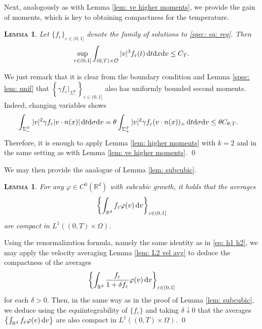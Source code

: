 \documentclass[10pt, reqno]{amsart}
\theoremstyle{plain}
\newtheorem{lemma}[theorem]{\normalfont \scshape Lemma}
\theoremstyle{definition}
\theoremstyle{remark}
\renewenvironment{proof}[1][\proofname]{\noindent{\scshape #1.\quad}}{\qed}
\numberwithin{equation}{section}
\newcommand{\calO}{\mathcal O}
\newcommand{\R}{\mathbb{R}}
\newcommand{\ve}{\varepsilon}
\newcommand{\dx}{\textnormal{d}x}
\newcommand{\dv}{\textnormal{d}v}
\newcommand{\dt}{\textnormal{d}t}
\newcommand{\tnd}{\textnormal{d}}
\newcommand{\lt}{\left}
\newcommand{\rt}{\right}
\newcommand{\intr}{\int_{\R^d}}
\begin{document}
Next, analogously as with Lemma \ref{lem: ve higher moments}, we provide the gain of moments, which is key to obtaining compactness for the temperature.

\begin{lemma}
    Let $\{f_\ve\}_{\ve\in (0,1]}$ denote the family of solutions to \eqref{spec: eq: reg}. Then
\[
        \sup_{\ve\in (0,1]} \int_{(0,T)\times \calO} |v|^3 f_\ve(t) \,\dt\dx\dv \le C_T.
\]
\end{lemma}
\begin{proof}
    We just remark that it is clear from the boundary condition and Lemma \ref{spec: lem: unif} that $\lt\{\gamma f_\ve|_{\Sigma_-^T}\rt\}_{\ve\in(0,1]}$ also has uniformly bounded second moments. Indeed, changing variables shows
    \begin{align*}
        \int_{\Sigma_-^T} |v|^2 \gamma f_\ve |v\cdot n(x)|\,\dt\tnd\sigma\dv &= \theta \int_{\Sigma_+^T} |v|^2 \gamma f_\ve (v\cdot n(x))_+ \,\dt\tnd\sigma\dv \le \theta C_{\theta,T}.
    \end{align*}
    Therefore, it is enough to apply Lemma \ref{lem: higher moments} with $k=2$ and in the same setting as with Lemma \ref{lem: ve higher moments}. 
\end{proof}

We may then provide the analogue of Lemma \ref{lem: subcubic}.

\begin{lemma}\label{spec: lem: subcubic}
    For any $\varphi\in C^0(\R^d)$ with subcubic growth, it holds that the averages
    \begin{align*}
        \lt\{\intr f_\ve \varphi(v)\,\dv\rt\}_{\ve\in (0,1]}
    \end{align*}
    are compact in $L^1((0,T)\times \Omega)$.
\end{lemma}
\begin{proof}
    Using the renormalization formula, namely the same identity as in \eqref{eq: h1 h2}, we may apply the velocity averaging Lemma \ref{lem: L2 vel avg} to deduce the compactness of the averages
    \begin{align*}
        \lt\{\intr \frac{f_\ve}{1 + \delta f_\ve} \varphi(v) \,\dv\rt\}_{\ve\in (0,1]}
    \end{align*}
    for each $\delta>0$. Then, in the same way as in the proof of Lemma \ref{lem: subcubic}, we deduce using the equiintegrability of $\{f_\ve\}$ and taking $\delta\downarrow 0$ that the averages $\lt\{\intr f_\ve \varphi(v)\,\dv\rt\}$ are also compact in $L^1((0,T)\times\Omega)$.
\end{proof}
\end{document}
